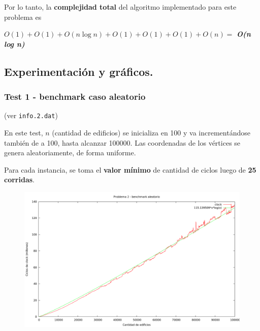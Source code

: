 Por lo tanto, la \textbf{complejidad total} del algoritmo implementado para este problema es

\begin{center}
  $O(1) + O(1) + O(n \log n) + O(1) + O(1) + O(1) + O(n) =$ \textit{\textbf{O(n log n)}}
\end{center}


\newpage


\subsection{Experimentación y gráficos.}

\vspace*{0.3cm}

\subsubsection{Test 1 - benchmark caso aleatorio}

(ver \verb|info.2.dat|) \medskip

En este test, $n$ (cantidad de edificios) se inicializa en 100 y va incrementándose también de a 100,
hasta alcanzar 100000. Las coordenadas de los vértices se genera aleatoriamente, de forma uniforme.

Para cada instancia, se toma el \textbf{valor mínimo} de cantidad de ciclos luego de \textbf{25 corridas}.

\vspace*{0.5cm}

\begin{figure}[h]
  \begin{center}
    \includegraphics[scale=0.35]{imagenes/grafico-2.png}
  \end{center}
\end{figure}

